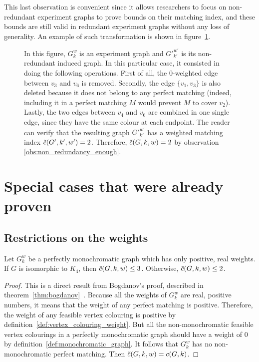 This last observation is convenient since it allows researchers to focus on non-redundant experiment graphs to prove bounds on their matching index, and these bounds are still valid in redundant experiment graphs without any loss of generality.
An example of such transformation is shown in figure~\ref{fig:non_redundant_induced_graph}.

\begin{figure}[H]
    \caption{In this figure, $G_k^w$ is an experiment graph and ${G'}_{k'}^{w'}$ is its non-redundant induced graph. In this particular case, it consisted in doing the following operations. First of all, the $0$-weighted edge between $v_3$ and $v_6$ is removed. Secondly, the edge $\{v_1, v_3\}$ is also deleted because it does not belong to any perfect matching (indeed, including it in a perfect matching $M$ would prevent $M$ to cover $v_2$). Lastly, the two edges between $v_4$ and $v_6$ are combined in one single edge, since they have the same colour at each endpoint. The reader can verify that the resulting graph ${G'}_{k'}^{w'}$ has a weighted matching index $\Tilde{c}(G', k', w') = 2$. Therefore, $\Tilde{c}(G, k, w) = 2$ by observation \ref{obs:non_redundancy_enough}.}
    \label{fig:non_redundant_induced_graph}
\end{figure}


\section{Special cases that were already proven}
\label{sec:proved-special-cases}

\subsection{Restrictions on the weights}
\label{subsec:proved-special-cases-weights}

\begin{lemma}
    \label{lem:real_pos_weights}
    Let $G_k^w$ be a perfectly monochromatic graph which has only positive, real weights.
    If $G$ is isomorphic to $K_4$, then $\Tilde{c}(G, k, w) \leq 3$.
    Otherwise, $\Tilde{c}(G, k, w) \leq 2$.
\end{lemma}

\begin{proof}
    This is a direct result from Bogdanov's proof, described in theorem~\ref{thm:bogdanov}~\cite{bogdanov}.
    Because all the weights of $G_k^w$ are real, positive numbers, it means that the weight of any perfect matching is positive.
    Therefore, the weight of any feasible vertex colouring is positive by definition~\ref{def:vertex_colouring_weight}.
    But all the non-monochromatic feasible vertex colourings in a perfectly monochromatic graph should have a weight of 0 by definition~\ref{def:monochromatic_graph}.
    It follows that $G_k^w$ has no non-monochromatic perfect matching.
    Then $\Tilde{c}(G, k, w) = c(G, k)$.
\end{proof}


